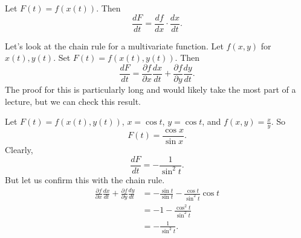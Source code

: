\begin{definition}
    Let $F(t) = f(x(t))$. Then  \[ \frac{dF}{dt} = \frac{df}{dx} \cdot \frac{dx}{dt}. \] 
\end{definition}

Let's look at the chain rule for a multivariate function. Let $f(x, y)$ for $x(t), y(t)$. Set $F(t) = f(x(t), y(t))$. Then \[ \frac{dF}{dt} = \frac{\partial f}{\partial x} \frac{dx}{dt} + \frac{\partial f}{\partial y} \frac{dy}{dt}. \] The proof for this is particularly long and would likely take the most part of a lecture, but we can check this result. 

\begin{example}
    Let $F(t) = f(x(t), y(t))$, $x = \cos{t}$, $y = \cos{t}$, and $f(x, y) = \frac{x}{y}$. So \[ F(t) = \frac{\cos{x}}{\sin{x}}.\] Clearly, \[ \frac{dF}{dt} = - \frac{1}{\sin^2{t}}. \] But let us confirm this with the chain rule.
    \begin{align*}
        \frac{\partial f}{\partial x} \frac{dx}{dt} + \frac{\partial f}{\partial y} \frac{dy}{dt} &= - \frac{\sin{t}}{\sin{t}} - \frac{\cos{t}}{\sin^2{t}} \cos{t} \\
        &= -1 - \frac{\cos^2{t}}{\sin^2{t}} \\
        &= - \frac{1}{\sin^2{t}}.
    \end{align*}
\end{example}
